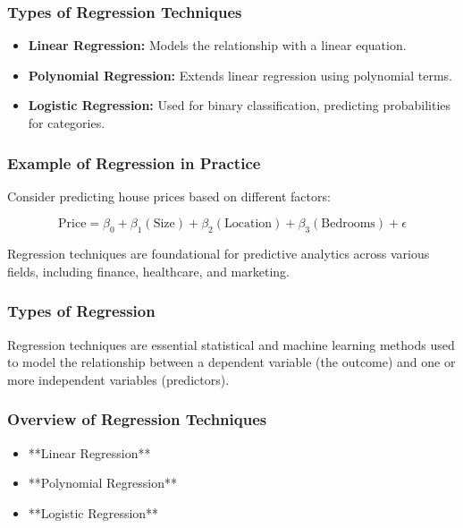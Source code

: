 \documentclass[aspectratio=169]{beamer}
\begin{document}
\begin{frame}[fragile]
    \frametitle{Types of Regression Techniques}
    \begin{itemize}
        \item \textbf{Linear Regression:} Models the relationship with a linear equation.
        \item \textbf{Polynomial Regression:} Extends linear regression using polynomial terms.
        \item \textbf{Logistic Regression:} Used for binary classification, predicting probabilities for categories.
    \end{itemize}
\end{frame}

\begin{frame}[fragile]
    \frametitle{Example of Regression in Practice}
    Consider predicting house prices based on different factors:
    
    \begin{equation}
        \text{Price} = \beta_0 + \beta_1(\text{Size}) + \beta_2(\text{Location}) + \beta_3(\text{Bedrooms}) + \epsilon
    \end{equation}

    Regression techniques are foundational for predictive analytics across various fields, including finance, healthcare, and marketing.
\end{frame}

\begin{frame}[fragile]
    \frametitle{Types of Regression}
    Regression techniques are essential statistical and machine learning methods used to model the relationship between a dependent variable (the outcome) and one or more independent variables (predictors). 
\end{frame}

\begin{frame}[fragile]
    \frametitle{Overview of Regression Techniques}
    \begin{itemize}
        \item **Linear Regression**
        \item **Polynomial Regression**
        \item **Logistic Regression**
    \end{itemize}
\end{frame}
\end{document}
